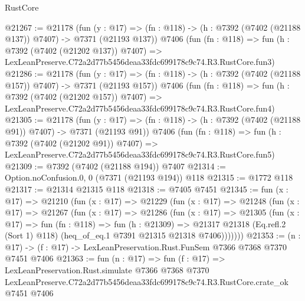 \begin{lexlean}{RustCore}
\begin{coremodule}
@21267 := @21178
    (fun (y : @17) => (fn : @118) -> (h : @7392 (@7402 (@21188 @137)) @7407) -> @7371 (@21193 @137))
    @7406
    (fun (fn : @118) =>
    fun (h : @7392 (@7402 (@21202 @137)) @7407) =>
    LexLeanPreserve.C72a2d77b5456deaa33fdc699178c9c74.R3.RustCore.fun3)
@21286 := @21178
    (fun (y : @17) => (fn : @118) -> (h : @7392 (@7402 (@21188 @157)) @7407) -> @7371 (@21193 @157))
    @7406
    (fun (fn : @118) =>
    fun (h : @7392 (@7402 (@21202 @157)) @7407) =>
    LexLeanPreserve.C72a2d77b5456deaa33fdc699178c9c74.R3.RustCore.fun4)
@21305 := @21178
    (fun (y : @17) => (fn : @118) -> (h : @7392 (@7402 (@21188 @91)) @7407) -> @7371 (@21193 @91))
    @7406
    (fun (fn : @118) =>
    fun (h : @7392 (@7402 (@21202 @91)) @7407) =>
    LexLeanPreserve.C72a2d77b5456deaa33fdc699178c9c74.R3.RustCore.fun5)
@21309 := @7392 (@7402 (@21188 @194)) @7407
@21314 := Option.noConfusion.{0, 0} (@7371 (@21193 @194)) @118
@21315 := @1772 @118
@21317 := @21314 @21315 @118
@21318 := @7405 @7451
@21345 := fun (x : @17) =>
  @21210
    (fun (x : @17) =>
    @21229
      (fun (x : @17) =>
      @21248
        (fun (x : @17) =>
        @21267
          (fun (x : @17) =>
          @21286
            (fun (x : @17) =>
            @21305
              (fun (x : @17) =>
              fun (fn : @118) =>
              fun (h : @21309) =>
              @21317
                @21318
                (Eq.refl.{2} (Sort 1) @118)
                (heq_of_eq.{1} @7391 @21315 @21318 @7406)))))))
@21353 := (n : @17) -> (f : @17) -> LexLeanPreservation.Rust.FunSem @7366 @7368 @7370 @7451 @7406
@21363 := fun (n : @17) =>
  fun (f : @17) =>
  LexLeanPreservation.Rust.simulate
    @7366
    @7368
    @7370
    LexLeanPreserve.C72a2d77b5456deaa33fdc699178c9c74.R3.RustCore.crate_ok
    @7451
    @7406
\end{coremodule}
\end{lexlean}
